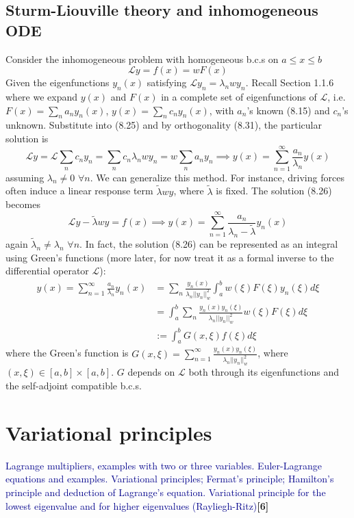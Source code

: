 \documentclass[a4paper]{article}
\begin{document}
\subsection{Sturm-Liouville theory and inhomogeneous ODE}
Consider the inhomogeneous problem with homogeneous b.c.s on $a\leq x\leq b$
\begin{equation}
    \mathcal{L}y=f(x)=wF(x)\tag{8.25}
\end{equation}
Given the eigenfunctions $y_n(x)$ satisfying $\mathcal{L}y_n=\lambda_nwy_n$. Recall Section 1.1.6 where we expand $y(x)$ and $F(x)$ in a complete set of eigenfunctions of $\mathcal{L}$, i.e. $F(x)=\sum_na_ny_n(x)$,  $y(x)=\sum_nc_ny_n(x)$, with $a_n$'s known (8.15) and $c_n$'s unknown. Substitute into (8.25) and by orthogonality (8.31), the particular solution is
\begin{equation}
    \mathcal{L}y=\mathcal{L}\sum_nc_ny_n=\sum_nc_n\lambda_nwy_n=w\sum_na_ny_n\implies y(x)=\sum_{n=1}^\infty\frac{a_n}{\lambda_n}y(x)\tag{8.26}
\end{equation}
assuming $\lambda_n\neq 0$ $\forall n$. We can generalize this method. For instance, driving forces often induce a linear response term $\tilde{\lambda}wy$, where $\tilde{\lambda}$ is fixed. The solution (8.26) becomes
\begin{equation}
    \mathcal{L}y-\tilde{\lambda}wy=f(x)\implies y(x)=\sum_{n=1}^\infty\frac{a_n}{\lambda_n-\tilde{\lambda}}y_n(x)\tag{8.27}
\end{equation}
again $\tilde{\lambda}_n\neq\lambda_n$ $\forall n$. In fact, the solution (8.26) can be represented as an integral using Green's functions (more later, for now treat it as a formal inverse to the differential operator $\mathcal{L}$):
\begin{align}
y(x)=\sum_{n=1}^\infty\frac{a_n}{\lambda_n}y_n(x)&=\sum_n\frac{y_n(x)}{\lambda_n||y_n||^2_w}\int_a^bw(\xi)F(\xi)y_n(\xi)d\xi\nonumber\\&=\int_a^b\sum_n\frac{y_n(x)y_n(\xi)}{\lambda_n||y_n||^2_w}w(\xi)F(\xi)d\xi\nonumber\\&:=\int_a^bG(x,\xi)f(\xi)d\xi\tag{8.28}
\end{align}
where the Green's function is $G(x,\xi)=\sum_{n=1}^\infty\frac{y_n(x)y_n(\xi)}{\lambda_n||y_n||_w^2}$, where $(x,\xi)\in[a,b]\times[a,b]$. $G$ depends on $\mathcal{L}$ both through its eigenfunctions and the self-adjoint compatible b.c.s. 
\newpage
\section{Variational principles}
{\small\textcolor{darkblue}{Lagrange multipliers, examples with two or three variables. Euler-Lagrange equations and examples. Variational principles; Fermat's principle; Hamilton's principle and deduction of Lagrange's equation. Variational principle for the lowest eigenvalue and for higher eigenvalues (Rayliegh-Ritz)}\hfill\textbf{[6]}}
\end{document}
